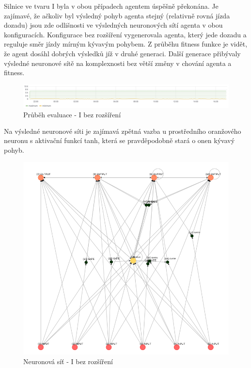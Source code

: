 Silnice ve tvaru I byla v obou případech agentem úspěšně překonána. Je zajímavé, že ačkoliv byl výsledný pohyb agenta stejný (relativně rovná jízda dozadu) jsou zde odlišnosti ve výsledných neuronových sítí agenta v obou konfiguracích.
Konfigurace bez rozšíření vygenerovala agenta, který jede dozadu a reguluje směr jízdy mírným kývavým pohybem. 
Z průběhu fitness funkce je vidět, že agent dosáhl dobrých výsledků jíž v druhé generaci. Další generace přibývaly výsledné neuronové sítě na komplexnosti bez větší změny v chování agenta a fitness.
\begin{figure}[H]
	\centering
	\includegraphics[width=1.0\linewidth]{solutions/Ibasic/basicGraph}
	\caption{Průběh evaluace - I bez rozšíření}
	\label{fig:basicgraph}
\end{figure}
Na výsledné neuronové síti je zajímavá zpětná vazba u prostředního oranžového neuronu s aktivační funkcí tanh, která se pravděpodobně stará o onen kývavý pohyb.
\begin{figure}[H]
	\centering
	\includegraphics[width=0.6\linewidth]{solutions/Ibasic/basic}
	\caption{Neuronová síť - I bez rozšíření}
	\label{fig:basic}
\end{figure}

